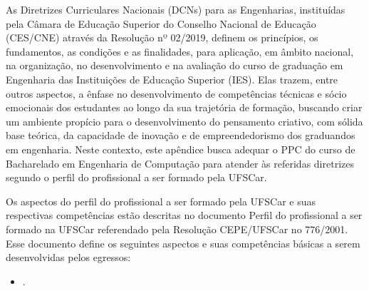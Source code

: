 

As Diretrizes Curriculares Nacionais (DCNs) para as Engenharias, instituídas pela Câmara de Educação Superior do Conselho Nacional de Educação (CES/CNE) através da Resolução nº 02/2019, definem os princípios, os fundamentos, as condições e as finalidades, para aplicação, em âmbito nacional, na organização, no desenvolvimento e na avaliação do curso de graduação em Engenharia das Instituições de Educação Superior (IES). Elas trazem, entre outros aspectos, a ênfase no desenvolvimento de competências técnicas e sócio emocionais dos estudantes ao longo da sua trajetória de formação, buscando criar um ambiente propício para o desenvolvimento do pensamento criativo, com sólida base teórica, da capacidade de inovação e de empreendedorismo dos graduandos em engenharia. Neste contexto, este apêndice busca adequar o PPC do curso de Bacharelado em Engenharia de Computação para atender às referidas diretrizes segundo o perfil do profissional a ser formado pela UFSCar.




Os aspectos do perfil do profissional a ser formado pela UFSCar e suas respectivas competências estão descritas no documento Perfil do profissional a ser formado na UFSCar \cite{ufscar2008perfil} referendado pela Resolução CEPE/UFSCar no 776/2001. Esse documento define os seguintes aspectos e suas competências básicas a serem desenvolvidas pelos egressos:

\begin{itemize}
    \singlespacing
    \setlength{\itemsep}{0pt}
    \item {}.  %
\end{itemize}

